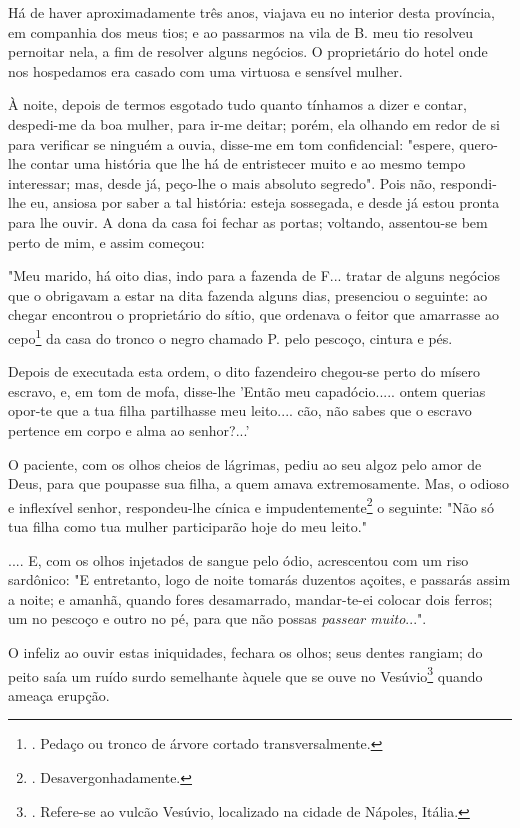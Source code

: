 Há de haver aproximadamente três anos, viajava eu no interior desta
província, em companhia dos meus tios; e ao passarmos na vila de B. meu
tio resolveu pernoitar nela, a fim de resolver alguns negócios. O
proprietário do hotel onde nos hospedamos era casado com uma virtuosa e
sensível mulher.

À noite, depois de termos esgotado tudo quanto tínhamos a dizer e
contar, despedi-me da boa mulher, para ir-me deitar; porém, ela olhando
em redor de si para verificar se ninguém a ouvia, disse-me em tom
confidencial: "espere, quero-lhe contar uma história que lhe há de
entristecer muito e ao mesmo tempo interessar; mas, desde já, peço-lhe o
mais absoluto segredo". Pois não, respondi-lhe eu, ansiosa por saber a
tal história: esteja sossegada, e desde já estou pronta para lhe ouvir.
A dona da casa foi fechar as portas; voltando, assentou-se bem perto de
mim, e assim começou:

"Meu marido, há oito dias, indo para a fazenda de F... tratar de alguns
negócios que o obrigavam a estar na dita fazenda alguns dias, presenciou
o seguinte: ao chegar encontrou o proprietário do sítio, que ordenava o
feitor que amarrasse ao cepo\footnote{. Pedaço ou tronco de árvore
  cortado transversalmente.} da casa do tronco o negro chamado P. pelo
pescoço, cintura e pés.

Depois de executada esta ordem, o dito fazendeiro chegou-se perto do
mísero escravo, e, em tom de mofa, disse-lhe 'Então meu capadócio.....
ontem querias opor-te que a tua filha partilhasse meu leito.... cão, não
sabes que o escravo pertence em corpo e alma ao senhor?...'

O paciente, com os olhos cheios de lágrimas, pediu ao seu algoz pelo
amor de Deus, para que poupasse sua filha, a quem amava extremosamente.
Mas, o odioso e inflexível senhor, respondeu-lhe cínica e
impudentemente\footnote{. Desavergonhadamente.} o seguinte: "Não só tua
filha como tua mulher participarão hoje do meu leito."

.... E, com os olhos injetados de sangue pelo ódio, acrescentou com um
riso sardônico: "E entretanto, logo de noite tomarás duzentos açoites, e
passarás assim a noite; e amanhã, quando fores desamarrado, mandar-te-ei
colocar dois ferros; um no pescoço e outro no pé, para que não possas
\emph{passear muito}...".

O infeliz ao ouvir estas iniquidades, fechara os olhos; seus dentes
rangiam; do peito saía um ruído surdo semelhante àquele que se ouve no
Vesúvio\footnote{. Refere-se ao vulcão Vesúvio, localizado na cidade de
  Nápoles, Itália.} quando ameaça erupção.

